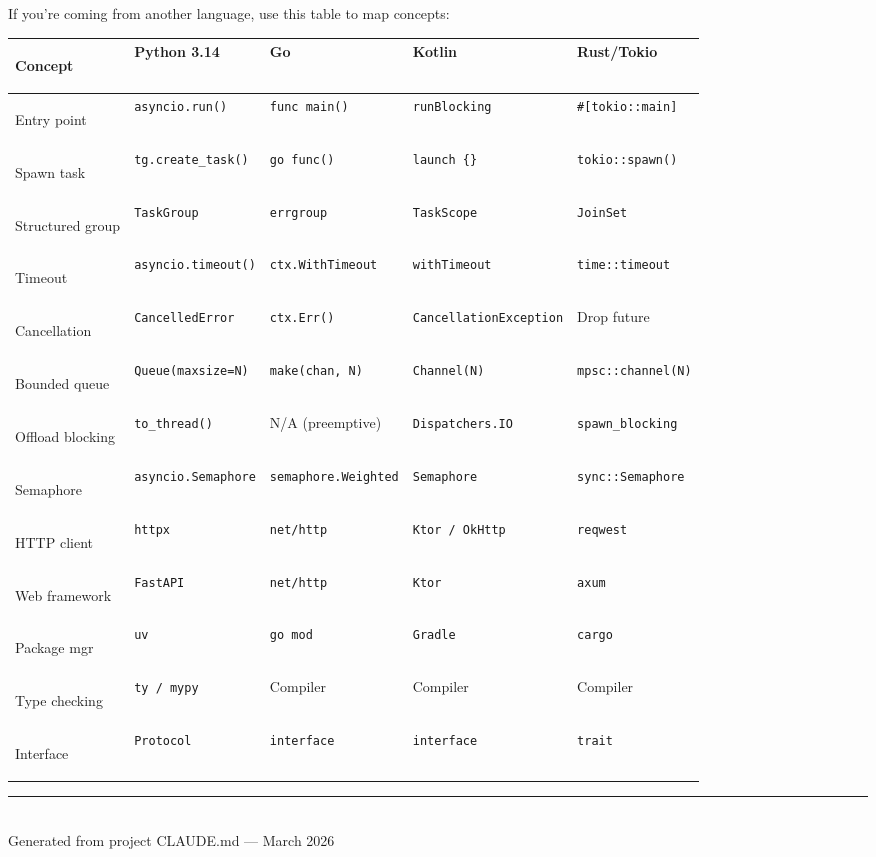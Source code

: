 \documentclass[11pt,a4paper,oneside]{book}
\newcommand{\py}[1]{\texttt{\color{pyblue}#1}}
\newcommand{\gocode}[1]{\texttt{\color{goblue}#1}}
\newcommand{\rustcode}[1]{\texttt{\color{BrickRed}#1}}
\newcommand{\javacode}[1]{\texttt{\color{javaorange!80!black}#1}}
\begin{document}
If you're coming from another language, use this table to map concepts:

\vspace{12pt}

\begin{center}
\renewcommand{\arraystretch}{1.4}
\begin{tcolorbox}[
    colback=white,
    colframe=pyblue!50!black,
    coltitle=white,
    colbacktitle=pyblue!70!black,
    fonttitle=\bfseries\sffamily\large,
    title={Concept Translation Table},
    arc=3pt,
    boxrule=1.5pt,
    width=0.98\textwidth,
]
\scriptsize
\setlength{\tabcolsep}{3pt}
\newcommand{\tcell}[1]{\raggedright\arraybackslash #1}
\begin{tabularx}{\textwidth}{>{\bfseries\raggedright\arraybackslash}p{1.8cm}
    >{\raggedright\arraybackslash}p{2.5cm}
    >{\raggedright\arraybackslash}p{2.2cm}
    >{\raggedright\arraybackslash}p{2.5cm}
    >{\raggedright\arraybackslash}p{2.5cm}}
\toprule
Concept &
\textcolor{pyblue}{\textbf{Python 3.14}} &
\textcolor{goblue}{\textbf{Go}} &
\textcolor{javaorange}{\textbf{Kotlin}} &
\textcolor{BrickRed}{\textbf{Rust/Tokio}} \\
\midrule
Entry point &
\py{asyncio.run()} &
\gocode{func main()} &
\javacode{runBlocking} &
\rustcode{\#[tokio::main]} \\
Spawn task &
\py{tg.create\_task()} &
\gocode{go func()} &
\javacode{launch \{\}} &
\rustcode{tokio::spawn()} \\
Structured group &
\py{TaskGroup} &
\gocode{errgroup} &
\javacode{TaskScope} &
\rustcode{JoinSet} \\
Timeout &
\py{asyncio.timeout()} &
\gocode{ctx.WithTimeout} &
\javacode{withTimeout} &
\rustcode{time::timeout} \\
Cancellation &
\py{CancelledError} &
\gocode{ctx.Err()} &
\javacode{Cancellation\-Exception} &
Drop future \\
Bounded queue &
\py{Queue(maxsize=N)} &
\gocode{make(chan, N)} &
\javacode{Channel(N)} &
\rustcode{mpsc::channel(N)} \\
Offload blocking &
\py{to\_thread()} &
N/A (preemptive) &
\javacode{Dispatchers.IO} &
\rustcode{spawn\_blocking} \\
Semaphore &
\py{asyncio.Semaphore} &
\gocode{semaphore.\-Weighted} &
\javacode{Semaphore} &
\rustcode{sync::Semaphore} \\
HTTP client &
\py{httpx} &
\gocode{net/http} &
\javacode{Ktor / OkHttp} &
\rustcode{reqwest} \\
Web framework &
\py{FastAPI} &
\gocode{net/http} &
\javacode{Ktor} &
\rustcode{axum} \\
Package mgr &
\py{uv} &
\gocode{go mod} &
\javacode{Gradle} &
\rustcode{cargo} \\
Type checking &
\py{ty / mypy} &
Compiler &
Compiler &
Compiler \\
Interface &
\py{Protocol} &
\gocode{interface} &
\javacode{interface} &
\rustcode{trait} \\
\bottomrule
\end{tabularx}
\end{tcolorbox}
\end{center}

\vfill

\begin{center}
\rule{0.4\textwidth}{0.5pt}\\[6pt]
{\small\sffamily\color{Gray}
Generated from project CLAUDE.md --- March 2026}
\end{center}
\end{document}
